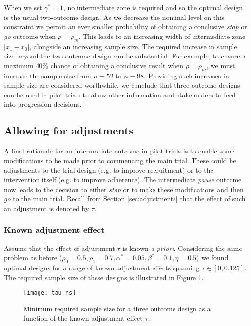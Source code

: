 \documentclass[referee, lineno, pdflatex,sn-vancouver,Numbered]{sn-jnl}%
\theoremstyle{thmstyleone}%
\theoremstyle{thmstyletwo}%
\theoremstyle{thmstylethree}%
\begin{document}
When we set $\gamma^* = 1$, no intermediate zone is required and so the optimal design is the usual two-outcome design. As we decrease the nominal level on this constraint we permit an ever smaller probability of obtaining a conclusive \emph{stop} or \emph{go} outcome when $\rho = \rho_m$. This leads to an increasing width of intermediate zone $|x_1 - x_0|$, alongside an increasing sample size. The required increase in sample size beyond the two-outcome design can be substantial. For example, to ensure a maximum 40\% chance of obtaining a conclusive result when $\rho = \rho_m$, we must increase the sample size from $n = 52$ to $n = 98$. Providing such increases in sample size are considered worthwhile, we conclude that three-outcome designs can be used in pilot trials to allow other information and stakeholders to feed into progression decisions.

\subsection{Allowing for adjustments}

A final rationale for an intermediate outcome in pilot trials is to enable some modifications to be made prior to commencing the main trial. These could be adjustments to the trial design (e.g. to improve recruitment) or to the intervention itself (e.g. to improve adherence). The intermediate \emph{pause} outcome now leads to the decision to either \emph{stop} or to make these modifications and then \emph{go} to the main trial. Recall from Section \ref{sec:adjustments} that the effect of such an adjustment is denoted by $\tau$.

\subsubsection{Known adjustment effect}

Assume that the effect of adjustment $\tau$ is known \emph{a priori}. Considering the same problem as before ($\rho_0 = 0.5, \rho_1 = 0.7, \alpha^* = 0.05, \beta^* = 0.1, \eta = 0.5$) we found optimal designs for a range of known adjustment effects spanning $\tau \in [0, 0.125]$. The required sample size of these designs is illustrated in Figure \ref{fig:tau_ns}. 

\begin{figure}
\centering
\texttt{[image: tau\_ns]}
\caption{Minimum required sample size for a three outcome design as a function of the known adjustment effect $\tau$.}
\label{fig:tau_ns}
\end{figure}
\end{document}
